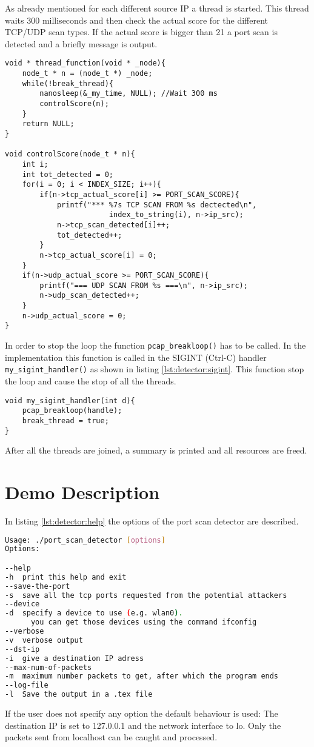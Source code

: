 As already mentioned for each different source IP a thread is started.
This thread waits 300 milliseconds and then check the actual score for
the different TCP/UDP scan types. If the actual score is bigger than
21 a port scan is detected and a briefly message is output. 
\begin{lstlisting}[style=MyC]
void * thread_function(void * _node){	
	node_t * n = (node_t *) _node;
	while(!break_thread){
		nanosleep(&_my_time, NULL); //Wait 300 ms
		controlScore(n);
	}
	return NULL;
}

void controlScore(node_t * n){
	int i;
	int tot_detected = 0;
	for(i = 0; i < INDEX_SIZE; i++){
		if(n->tcp_actual_score[i] >= PORT_SCAN_SCORE){
			printf("*** %7s TCP SCAN FROM %s dectected\n",
						index_to_string(i), n->ip_src);
			n->tcp_scan_detected[i]++;
			tot_detected++;
		}
		n->tcp_actual_score[i] = 0;
	}
	if(n->udp_actual_score >= PORT_SCAN_SCORE){
		printf("=== UDP SCAN FROM %s ===\n", n->ip_src);
		n->udp_scan_detected++;
	}
	n->udp_actual_score = 0;
}
\end{lstlisting}


In order to stop the loop the function \lstinline|pcap_breakloop()| has to be called.
In the implementation this function is called in the SIGINT (Ctrl-C) handler \lstinline|my_sigint_handler()| as shown
in listing \ref{lst:detector:sigint}. This function stop the loop and cause the stop of all the threads.
\begin{lstlisting}[style=MyC, caption=Handler that process the SIGINT signal., label=lst:detector:sigint]
void my_sigint_handler(int d){
	pcap_breakloop(handle);
	break_thread = true;
}
\end{lstlisting}
After all the threads are joined, a summary is printed and all resources are freed.



\section{Demo Description}
In listing \ref{lst:detector:help} the options of the port scan detector are described.
\begin{lstlisting}[frame=single, language=BASH, label=lst:detector:help, caption=Help page of the port scan detector.]
Usage: ./port_scan_detector [options]
Options:

--help
-h	print this help and exit
--save-the-port
-s	save all the tcp ports requested from the potential attackers
--device
-d	specify a device to use (e.g. wlan0). 
	  you can get those devices using the command ifconfig
--verbose
-v	verbose output
--dst-ip
-i	give a destination IP adress
--max-num-of-packets
-m	maximum number packets to get, after which the program ends
--log-file
-l	Save the output in a .tex file
\end{lstlisting}
If the user does not specify any option the default behaviour is used:
The destination IP is set to 127.0.0.1 and the network interface to lo. Only
the packets sent from localhost can be caught and processed.

